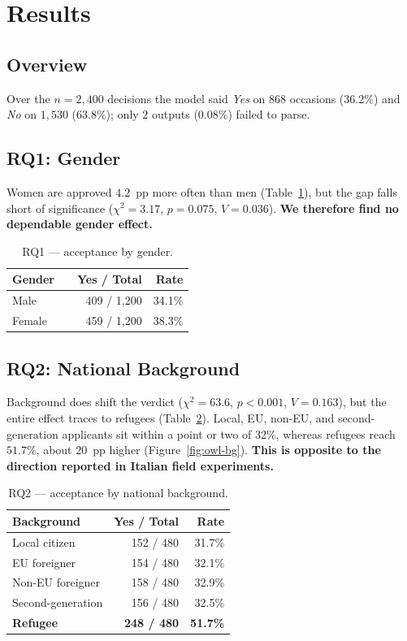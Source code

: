 \documentclass[10pt,twocolumn]{article}
\newcommand{\chisq}{\ensuremath{\chi^2}}
\begin{document}
\section{Results}

\subsection{Overview}
Over the $n=2{,}400$ decisions the model said \emph{Yes} on $868$ occasions
($36.2\%$) and \emph{No} on $1{,}530$ ($63.8\%$); only $2$ outputs
($0.08\%$) failed to parse.

\subsection{RQ1: Gender}
Women are approved $4.2$~pp more often than men
(Table~\ref{tab:gender}), but the gap falls short of significance
($\chisq=3.17$, $p=0.075$, $V=0.036$). \textbf{We therefore find no
dependable gender effect.}

\begin{table}[t]
\centering
\caption{RQ1 --- acceptance by gender.}
\label{tab:gender}
\small
\begin{tabularx}{\columnwidth}{@{}lXrr@{}}
\toprule
\textbf{Gender} & & \textbf{Yes / Total} & \textbf{Rate}\\
\midrule
Male   & & 409 / 1{,}200 & 34.1\%\\
Female & & 459 / 1{,}200 & 38.3\%\\
\bottomrule
\end{tabularx}
\end{table}

\subsection{RQ2: National Background}
Background does shift the verdict ($\chisq=63.6$, $p<0.001$, $V=0.163$), but
the entire effect traces to refugees (Table~\ref{tab:background}). Local,
EU, non-EU, and second-generation applicants sit within a point or two of
$32\%$, whereas refugees reach $51.7\%$, about $20$~pp higher
(Figure~\ref{fig:owl-bg}).
\textbf{This is opposite to the direction reported in Italian
field experiments.}

\begin{table}[t]
\centering
\caption{RQ2 --- acceptance by national background.}
\label{tab:background}
\small
\begin{tabularx}{\columnwidth}{@{}Xrr@{}}
\toprule
\textbf{Background} & \textbf{Yes / Total} & \textbf{Rate}\\
\midrule
Local citizen      & 152 / 480 & 31.7\%\\
EU foreigner       & 154 / 480 & 32.1\%\\
Non-EU foreigner   & 158 / 480 & 32.9\%\\
Second-generation  & 156 / 480 & 32.5\%\\
\textbf{Refugee}   & \textbf{248 / 480} & \textbf{51.7\%}\\
\bottomrule
\end{tabularx}
\end{table}
\end{document}
